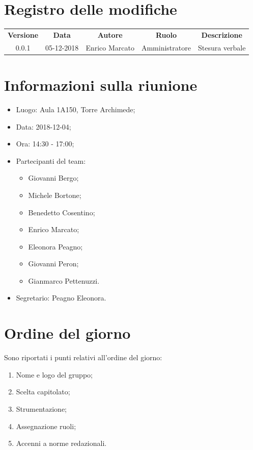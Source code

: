 \documentclass[11pt,a4paper]{article}
\begin{document}
	

	\tableofcontents
	\newpage
	\section*{\centering Registro delle modifiche}
	\begin{tabularx}{\textwidth}{ c | c | c | c | X }
		\rowcolor{LightBlue}
		\color{white}\bfseries Versione & \color{white}\bfseries Data & \color{white}\bfseries Autore & \color{white}\bfseries Ruolo & \multicolumn{1}{c}{\color{white}\bfseries Descrizione}\\[0.25cm]
		0.0.1 & 05-12-2018 & Enrico Marcato & Amministratore & Stesura verbale \\
	\end{tabularx}

	\newpage
	\section{Informazioni sulla riunione}
	\begin{itemize}
	\item Luogo: Aula 1A150, Torre Archimede;
	\item Data: 2018-12-04;
	\item Ora: 14:30 - 17:00;
	\item Partecipanti del team: 
	\begin{itemize}
		\item Giovanni Bergo;
		\item Michele Bortone;
		\item Benedetto Cosentino;
		\item Enrico Marcato;
		\item Eleonora Peagno;
		\item Giovanni Peron;
		\item Gianmarco Pettenuzzi.
	\end{itemize}
	\item Segretario: Peagno Eleonora.
	\end{itemize}

	\section{Ordine del giorno}
	Sono riportati i punti relativi all'ordine del giorno:
	\begin{enumerate}
	\item Nome e logo del gruppo;
	\item Scelta capitolato;
	\item Strumentazione;
	\item Assegnazione ruoli;
	\item Accenni a norme redazionali.
	\end{enumerate}
	
\end{document}
